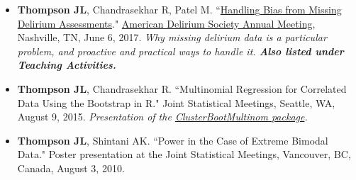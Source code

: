 \documentclass[5pt]{article}
\begin{document}
\begin{itemize}
\item \textbf{Thompson JL}, Chandrasekhar R, Patel M. ``\href{https://github.com/jenniferthompson/ADS2017}{Handling Bias from Missing Delirium Assessments}." \href{http://www.cvent.com/events/7th-annual-american-delirium-society/event-summary-cd74fed5605a4918bc0a9c0e28561bac.aspx}{American Delirium Society Annual Meeting}, Nashville, TN, June 6, 2017. \emph{Why missing delirium data is a particular problem, and proactive and practical ways to handle it. \textbf{Also listed under Teaching Activities.}}
\item \textbf{Thompson JL}, Chandrasekhar R. ``Multinomial Regression for Correlated Data Using the Bootstrap in R." Joint Statistical Meetings, Seattle, WA, August 9, 2015. \emph{Presentation of the \href{https://github.com/jenniferthompson/ClusterBootMultinom}{ClusterBootMultinom package}.}
\item \textbf{Thompson JL}, Shintani AK. ``Power in the Case of Extreme Bimodal Data." Poster presentation at the Joint Statistical Meetings, Vancouver, BC, Canada, August 3, 2010.
\end{itemize}
\end{document}
